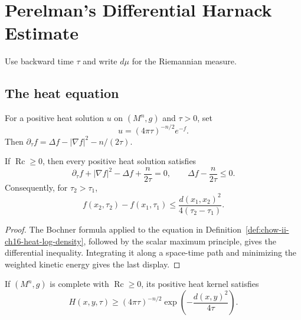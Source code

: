 \chapter[16]{Perelman's Differential Harnack Estimate}
\label{ch:chow-ii-perelman-differential-harnack}

Use backward time \(\tau\) and write \(d\mu\) for the Riemannian measure.

\section{The heat equation}

\begin{definition}
\label{def:chow-ii-ch16-heat-log-density}
For a positive heat solution $u$ on $(M^n,g)$ and $\tau>0$, set
\[
u=(4\pi\tau)^{-n/2}e^{-f}.
\]
Then $\partial_\tau f=\Delta f-|\nabla f|^2-n/(2\tau)$.
\end{definition}

\begin{theorem}
\label{thm:chow-ii-ch16-li-yau}
If $\operatorname{Rc}\ge0$, then every positive heat solution satisfies
\[
\partial_\tau f+|\nabla f|^2-\Delta f+\frac{n}{2\tau}=0,
\qquad \Delta f-\frac{n}{2\tau}\le0.
\]
Consequently, for $\tau_2>\tau_1$,
\[
f(x_2,\tau_2)-f(x_1,\tau_1)\le
 \frac{d(x_1,x_2)^2}{4(\tau_2-\tau_1)}.
\]
\end{theorem}
\begin{proof}
\sketch The Bochner formula applied to the equation in
Definition~\ref{def:chow-ii-ch16-heat-log-density}, followed by the scalar
maximum principle, gives the differential inequality. Integrating it along a
space-time path and minimizing the weighted kinetic energy gives the last
display.
\end{proof}

\begin{theorem}
\label{thm:chow-ii-ch16-cheeger-yau}
If $(M^n,g)$ is complete with $\operatorname{Rc}\ge0$, its positive heat kernel
satisfies
\[
H(x,y,\tau)\ge(4\pi\tau)^{-n/2}
 \exp\!\left(-\frac{d(x,y)^2}{4\tau}\right).
\]
\end{theorem}

